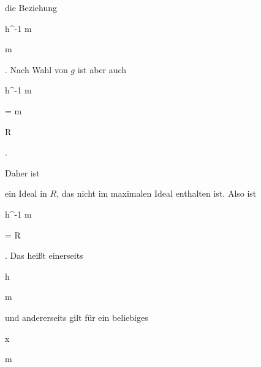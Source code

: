 {{{   }{
}

}
{}{}{}
die Beziehung


\mavergleichskettedisp

{\vergleichskette

{ h^{-1} {\mathfrak m}
}

{ \not\subseteq} { {\mathfrak m}
}

{ } {
}

{ } {
}

{ } {
}

}
{}{}{.}
Nach Wahl von $g$ ist aber auch


\mavergleichskettedisp

{\vergleichskette

{ h^{-1} {\mathfrak m}
}

{ =} {  {\mathfrak m}
}

{ \subseteq} { 
}

{ \subseteq} { R
}

{ } {
}

}
{}{}{.}


Daher ist

 ein Ideal in $R$, das nicht im maximalen Ideal enthalten ist. Also ist


\mavergleichskette

{\vergleichskette

{ h^{-1} {\mathfrak m}
}

{ = }{ R
}

{  }{
}

{    }{
}

{   }{
}

}
{}{}{.}
Das heißt einerseits


\mavergleichskette

{\vergleichskette

{h
}

{ \in }{ {\mathfrak m}
}

{  }{
}

{    }{
}

{   }{
}

}
{}{}{}
und andererseits gilt für ein beliebiges


\mavergleichskette

{\vergleichskette

{ x
}

{ \in }{ {\mathfrak m}
}

{  }{
}

{    }{
}

{   }{
}

}}
